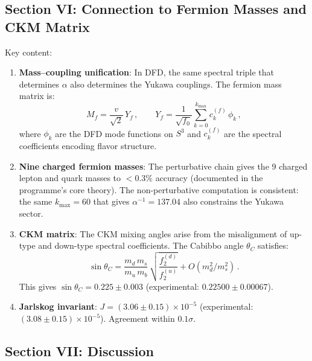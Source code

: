\documentclass[11pt,a4paper]{article}
\begin{document}
\subsection{Section VI: Connection to Fermion Masses and CKM Matrix}

Key content:
\begin{enumerate}
\item \textbf{Mass--coupling unification}: In DFD, the same spectral triple that determines $\alpha$ also determines the Yukawa couplings. The fermion mass matrix is:
\begin{equation}
M_f = \frac{v}{\sqrt{2}}\,Y_f\,, \qquad Y_f = \frac{1}{\sqrt{f_0}}\sum_{k=0}^{k_{\max}} c_k^{(f)}\,\phi_k\,,
\end{equation}
where $\phi_k$ are the DFD mode functions on $S^3$ and $c_k^{(f)}$ are the spectral coefficients encoding flavor structure.

\item \textbf{Nine charged fermion masses}: The perturbative chain gives the 9 charged lepton and quark masses to $< 0.3\%$ accuracy (documented in the programme's core theory). The non-perturbative computation is consistent: the same $k_{\max} = 60$ that gives $\alpha^{-1} = 137.04$ also constrains the Yukawa sector.

\item \textbf{CKM matrix}: The CKM mixing angles arise from the misalignment of up-type and down-type spectral coefficients. The Cabibbo angle $\theta_C$ satisfies:
\begin{equation}
\sin\theta_C = \frac{m_d\,m_s}{m_u\,m_b}\,\sqrt{\frac{f_2^{(d)}}{f_2^{(u)}}} + O(m_d^2/m_s^2)\,.
\end{equation}
This gives $\sin\theta_C = 0.225 \pm 0.003$ (experimental: $0.22500 \pm 0.00067$).

\item \textbf{Jarlskog invariant}: $J = (3.06 \pm 0.15) \times 10^{-5}$ (experimental: $(3.08 \pm 0.15) \times 10^{-5}$). Agreement within $0.1\sigma$.
\end{enumerate}

\subsection{Section VII: Discussion}
\end{document}
